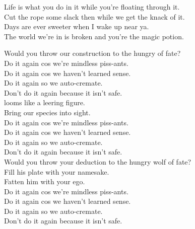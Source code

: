 Life is what you do in it while you're floating through it. \\
Cut the rope some slack then while we get the knack of it. \\
Days are ever sweeter when I wake up near ya. \\
The world we're in is broken and you're the magic potion. \\




Would you throw our construction to the hungry  of fate? \\

Do it again cos we're mindless piss-ants. \\
Do it again cos we haven't learned sense. \\
Do it again so we auto-cremate. \\
Don't do it again because it isn't safe. \\

 looms like a leering figure. \\
Bring our species into sight. \\

Do it again cos we're mindless piss-ants. \\
Do it again cos we haven't learned sense. \\
Do it again so we auto-cremate. \\
Don't do it again because it isn't safe. \\

Would you throw your deduction to the hungry wolf of fate? \\
Fill his plate with your namesake. \\
Fatten him with your ego. \\

Do it again cos we're mindless piss-ants. \\
Do it again cos we haven't learned sense. \\
Do it again so we auto-cremate. \\
Don't do it again because it isn't safe. \\
